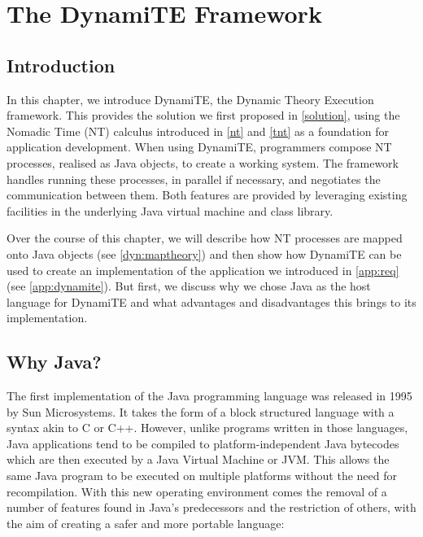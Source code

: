 
\chapter{The DynamiTE Framework}
\label{dynamite}

\section{Introduction}

In this chapter, we introduce DynamiTE, the Dynamic Theory Execution
framework.  This provides the solution we first proposed in
\ref{solution}, using the Nomadic Time (NT) calculus introduced in
\ref{nt} and \ref{tnt} as a foundation for application development.
When using DynamiTE, programmers compose NT processes, realised as
Java objects, to create a working system.  The framework handles
running these processes, in parallel if necessary, and negotiates the
communication between them.  Both features are provided by leveraging
existing facilities in the underlying Java virtual machine and class
library.

Over the course of this chapter, we will describe how NT processes are
mapped onto Java objects (see \ref{dyn:maptheory}) and then show how
DynamiTE can be used to create an implementation of the application we
introduced in \ref{app:req} (see \ref{app:dynamite}).  But first, we
discuss why we chose Java as the host language for DynamiTE and what
advantages and disadvantages this brings to its implementation.

\section{Why Java?}

The first implementation of the Java programming language was released
in 1995 by Sun Microsystems.  It takes the form of a block structured
language with a syntax akin to C or C++.  However, unlike programs
written in those languages, Java applications tend to be compiled to
platform-independent Java bytecodes which are then executed by a Java
Virtual Machine or JVM.  This allows the same Java program to be
executed on multiple platforms without the need for recompilation.
With this new operating environment comes the removal of a number of
features found in Java's predecessors and the restriction of others,
with the aim of creating a safer and more portable language:

